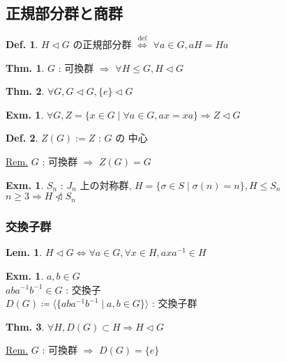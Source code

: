 \documentclass[uplatex,dvipdfmx,9pt]{beamer}
\newcommand{\defarrow}{\overset{\mathrm{def}}{\Leftrightarrow}}
\newcommand{\nsubgroup}{\vartriangleleft} %
\newcommand{\notnsubgroup}{\ntriangleleft} %
\newcounter{textLemCount}
\newcounter{textExmCount}
\theoremstyle{definition} %
\newtheorem{defn}{Def.}[subsection] %
\newtheorem{thm}{Thm.}[subsection] %
\newtheorem{lemText}[textLemCount]{Lem.} %
\theoremstyle{example}
\newtheorem{exmText}[textExmCount]{Exm.}
\begin{document}
    \subsection{\textsection \thesubsection 正規部分群と商群}
    \setcounter{textExmCount}{0}

      \begin{frame}
        
        \begin{defn}
          $H \nsubgroup G$ の\alert{正規部分群} $\defarrow$ $\forall a \in G, aH = Ha$
        \end{defn}

        \begin{thm}
          $G$ : 可換群 $\Rightarrow$ $\forall H \le G, H \nsubgroup G $
        \end{thm}

        \begin{thm}
          $\forall G, G \nsubgroup G, \{e\} \nsubgroup G$
        \end{thm}

        \begin{exmText}
          $\forall G, Z = \{ x \in G \mid \forall a \in G, ax = xa\} \Rightarrow Z \nsubgroup G$
        \end{exmText}

        \begin{defn}
          $Z(G) := Z$ : $G$ の \alert{中心}
        \end{defn}
        \underline{Rem.} $G$ : 可換群 $\Rightarrow$ $Z(G) = G$ \\

        \begin{exmText}
          $S_n$ : $J_n$ 上の対称群, $H = \{ \sigma \in S \mid \sigma(n) = n \}, H \le S_n$ \\
          $n \ge 3 \Rightarrow H \notnsubgroup S_n$
        \end{exmText}

      \end{frame}

      \begin{frame}
        \frametitle{交換子群}

        \begin{lemText}
          $H \nsubgroup G \Leftrightarrow \forall a \in G, \forall x \in H, axa^{-1} \in H$
        \end{lemText}
        
        \begin{exmText}
          $a,b \in G$ \\
          $aba^{-1}b^{-1} \in G$ : \alert{交換子} \\
          $D(G) \coloneqq \langle \{ aba^{-1}b^{-1} \mid a,b \in G \} \rangle$ : \alert{交換子群}
        \end{exmText}

        \begin{thm}
          $\forall H, D(G) \subset H \Rightarrow H \nsubgroup G$
        \end{thm}
        \underline{Rem.} $G$ : 可換群 $\Rightarrow$ $D(G) = \{e\}$ \\

      \end{frame}
\end{document}
